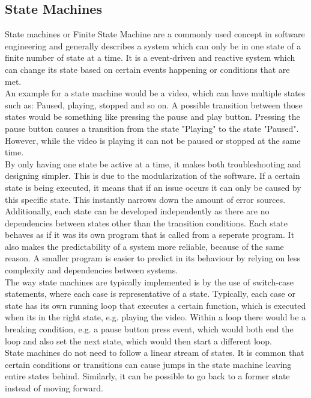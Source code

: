 \documentclass[fontsize=11pt,%
twoside,%
BCOR          = 8mm, %
DIV           = 11,  %
titlepage     = off,%
index=totoc,%
xcolor        = pdftex,%
dvipsnames,%
bibliography  = totoc,%
bibliography = numbered, %
listof        = notnumbered]{scrreprt}
\begin{document}
\subsection{State Machines}\label{sec:state_machine}
State machines or Finite State Machine are a commonly used concept in software engineering and generally describes a system which can only be in one state of a finite number of state at a time. It is a event-driven and reactive system which can change its state based on certain events happening or conditions that are met.\\
An example for a state machine would be a video, which can have multiple states such as: Paused, playing, stopped and so on. A possible transition between those states would be something like pressing the pause and play button. Pressing the pause button causes a transition from the state "Playing" to the state "Paused". However, while the video is playing it can not be paused or stopped at the same time.\\
By only having one state be active at a time, it makes both troubleshooting and designing simpler. This is due to the modularization of the software. If a certain state is being executed, it means that if an issue occurs it can only be caused by this specific state. This instantly narrows down the amount of error sources. Additionally, each state can be developed independently as there are no dependencies between states other than the transition conditions. Each state behaves as if it was its own program that is called from a seperate program. It also makes the predictability of a system more reliable, because of the same reason. A smaller program is easier to predict in its behaviour by relying on less complexity and dependencies between systems.\\
The way state machines are typically implemented is by the use of switch-case statements, where each case is representative of a state. Typically, each case or state has its own running loop that executes a certain function, which is executed when its in the right state, e.g. playing the video. Within a loop there would be a breaking condition, e.g. a pause button press event, which would both end the loop and also set the next state, which would then start a different loop.\\
State machines do not need to follow a linear stream of states. It is common that certain conditions or transitions can cause jumps in the state machine leaving entire states behind. Similarly, it can be possible to go back to a former state instead of moving forward.
\end{document}
